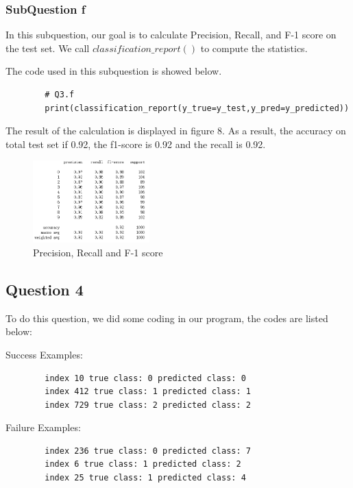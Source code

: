 \documentclass[conference]{IEEEtran}
\begin{document}
	\subsubsection{SubQuestion f}
	In this subquestion, our goal is to calculate Precision, Recall, and F-1 score on the test set. We call $classification\_report()$ to compute the statistics. \par
	
	The code used in this subquestion is showed below. \par
	
	
	
	\begin{lstlisting}
		# Q3.f
		print(classification_report(y_true=y_test,y_pred=y_predicted))
	\end{lstlisting} \par
	The result of the calculation is displayed in figure 8. As a result, the accuracy on total test set if 0.92, the f1-score is 0.92 and the recall is 0.92.
	\begin{figure}[h] 
		\centering
		\includegraphics[width=0.4\textwidth]{./graphs/T1Q3f.png}
		\caption{Precision, Recall and F-1 score}
		\label{Fig.t1q3f}
	\end{figure}
	\subsection{Question 4}
	To do this question, we did some coding in our program, the codes are listed below:
	
	Success Examples:
	\begin{lstlisting}
		index 10 true class: 0 predicted class: 0
		index 412 true class: 1 predicted class: 1
		index 729 true class: 2 predicted class: 2
	\end{lstlisting}
	Failure Examples:
	\begin{lstlisting}
		index 236 true class: 0 predicted class: 7
		index 6 true class: 1 predicted class: 2
		index 25 true class: 1 predicted class: 4
	\end{lstlisting}
	
\end{document}
